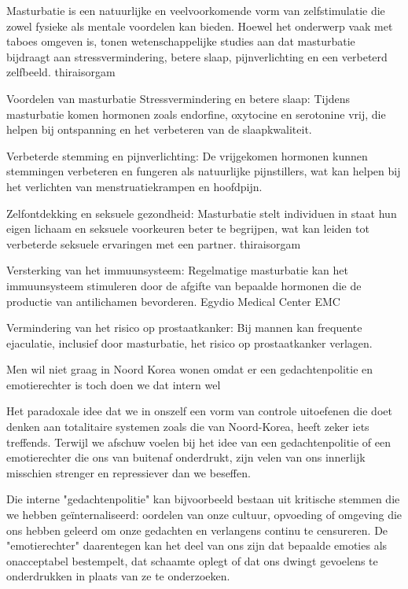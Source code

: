 Masturbatie is een natuurlijke en veelvoorkomende vorm van zelfstimulatie die zowel fysieke als mentale voordelen kan bieden. Hoewel het onderwerp vaak met taboes omgeven is, tonen wetenschappelijke studies aan dat masturbatie bijdraagt aan stressvermindering, betere slaap, pijnverlichting en een verbeterd zelfbeeld.
thiraisorgam

Voordelen van masturbatie
Stressvermindering en betere slaap: Tijdens masturbatie komen hormonen zoals endorfine, oxytocine en serotonine vrij, die helpen bij ontspanning en het verbeteren van de slaapkwaliteit.

Verbeterde stemming en pijnverlichting: De vrijgekomen hormonen kunnen stemmingen verbeteren en fungeren als natuurlijke pijnstillers, wat kan helpen bij het verlichten van menstruatiekrampen en hoofdpijn.

Zelfontdekking en seksuele gezondheid: Masturbatie stelt individuen in staat hun eigen lichaam en seksuele voorkeuren beter te begrijpen, wat kan leiden tot verbeterde seksuele ervaringen met een partner.
thiraisorgam

Versterking van het immuunsysteem: Regelmatige masturbatie kan het immuunsysteem stimuleren door de afgifte van bepaalde hormonen die de productie van antilichamen bevorderen.
Egydio Medical Center EMC

Vermindering van het risico op prostaatkanker: Bij mannen kan frequente ejaculatie, inclusief door masturbatie, het risico op prostaatkanker verlagen.

Men wil niet graag in Noord Korea wonen omdat er een gedachtenpolitie en emotierechter is toch doen we dat intern wel

Het paradoxale idee dat we in onszelf een vorm van controle uitoefenen die doet denken aan totalitaire systemen zoals die van Noord-Korea, heeft zeker iets treffends. Terwijl we afschuw voelen bij het idee van een gedachtenpolitie of een emotierechter die ons van buitenaf onderdrukt, zijn velen van ons innerlijk misschien strenger en repressiever dan we beseffen.

Die interne "gedachtenpolitie" kan bijvoorbeeld bestaan uit kritische stemmen die we hebben geïnternaliseerd: oordelen van onze cultuur, opvoeding of omgeving die ons hebben geleerd om onze gedachten en verlangens continu te censureren. De "emotierechter" daarentegen kan het deel van ons zijn dat bepaalde emoties als onacceptabel bestempelt, dat schaamte oplegt of dat ons dwingt gevoelens te onderdrukken in plaats van ze te onderzoeken.

